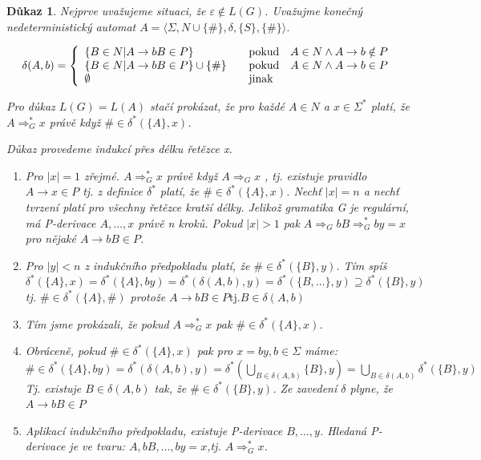 \documentclass[10pt, a4paper, titlepage]{article}
\theoremstyle{note}
\newtheorem{dukaz}{Důkaz}
\begin{document}
\begin{dukaz}
Nejprve uvažujeme situaci, že $\varepsilon \notin L(G)$. Uvažujme konečný nedeterministický automat $A = \langle \Sigma, N \cup \lbrace \# \rbrace, \delta, \lbrace S \rbrace,\lbrace \# \rbrace \rangle$.

$$
\delta(A,b)=\left\{
\begin{array}{l@{\quad\mbox{}\quad}l}
\lbrace B \in N | A \rightarrow bB \in P \rbrace & \text{pokud}\quad A \in N \wedge A \rightarrow b \notin P\\
\lbrace B \in N | A \rightarrow bB \in P \rbrace \cup \lbrace \# \rbrace & \text{pokud}\quad A \in N \wedge A \rightarrow b \in P\\
\emptyset & \text{jinak}\\
\end{array}
\right.
$$

Pro důkaz $L(G)=L(A)$ stačí prokázat, že pro každé $A \in N $  a $ x \in \Sigma^* $ platí, že $A \Rightarrow_G^* x$ právě když $ \# \in \delta^* (\lbrace A \rbrace,x)$.

Důkaz provedeme indukcí přes délku řetězce x. 
\begin{enumerate}
\item
Pro $|x|=1$ zřejmé. $A \Rightarrow_G^* x $ právě když $A \Rightarrow_G x $ , tj. existuje pravidlo $A \rightarrow x \in P$ tj. z definice $\delta^*$ platí, že $ \#\in \delta^* (\lbrace A \rbrace, x) $.
Nechť $|x|=n$ a nechť tvrzení platí pro všechny řetězce kratší délky. Jelikož gramatika G je regulární, má P-derivace $A,\ldots,x$ právě n kroků. Pokud $|x|>1$ pak $ A \Rightarrow_G bB \Rightarrow_G^* by = x $ pro nějaké $ A \rightarrow bB \in P$.

\item
Pro $|y|<n$ z indukčního předpokladu platí, že $\#\in \delta^* (\lbrace B \rbrace,y)$.
Tím spíš $\delta^* ( \lbrace A \rbrace, x ) = \delta^* ( \lbrace A \rbrace, by ) = \delta^* ( \delta( A , b ),y) = \delta^* ( \lbrace B,\ldots \rbrace, y ) \supseteq \delta^* ( \lbrace B \rbrace, y )$ tj. $ \# \in \delta^* (\lbrace A \rbrace,\#)$ protože $A \rightarrow bB \in P \text{tj.} B\in\delta (A,b)$

\item
Tím jsme prokázali, že pokud $A \Rightarrow^*_G x$ pak $\# \in \delta^* ( \lbrace A \rbrace , x )$.

\item
Obráceně, pokud $\#\in \delta^* ( \lbrace A \rbrace , x )$ pak pro $x=by, b\in \Sigma$ máme: $ \#\in \delta^* ( \lbrace A \rbrace , by ) = \delta^* ( \delta (A,b), y ) = \delta^* (\bigcup_{B\in\delta(A,b)}{\lbrace B \rbrace}, y) = \bigcup_{B\in\delta(A,b)}{\delta^* ( \lbrace B \rbrace , y)}$
Tj. existuje $ B \in \delta (A,b) $ tak, že $ \#\in\delta^* ( \lbrace B \rbrace ,y)$. Ze zavedení $\delta$ plyne, že $A \rightarrow bB \in P$

\item
Aplikací indukčního předpokladu, existuje P-derivace $B,\ldots,y$. Hledaná P-derivace je ve tvaru: $A,bB,\ldots,by=x$,tj. $A \Rightarrow^*_Gx$.
\end{enumerate}
\end{dukaz}
\end{document}

